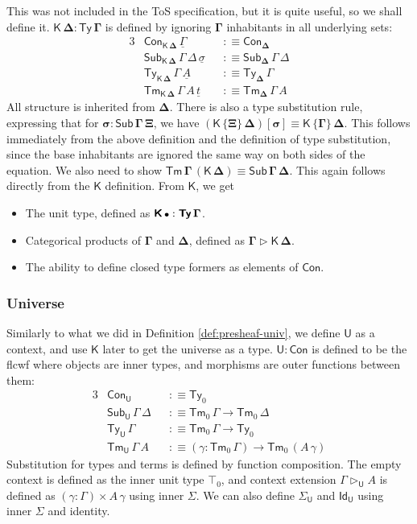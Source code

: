 \documentclass[12pt,a4paper,twoside,openany]{book}
\theoremstyle{remark}
\theoremstyle{definition}
\theoremstyle{theorem}
\newcommand{\bs}[1]{\boldsymbol{#1}}
\newcommand{\Con}{\mathsf{Con}}
\newcommand{\Sub}{\mathsf{Sub}}
\newcommand{\Tm}{\mathsf{Tm}}
\newcommand{\Ty}{\mathsf{Ty}}
\newcommand{\U}{\mathsf{U}}
\newcommand{\Id}{\mathsf{Id}}
\newcommand{\ext}{\triangleright}
\newcommand{\K}{\mathsf{K}}
\newcommand{\bCon}{\bs{\Con}}
\newcommand{\bTy}{\bs{\Ty}}
\newcommand{\bGamma}{\bs{\Gamma}}
\newcommand{\bDelta}{\bs{\Delta}}
\newcommand{\bemptycon}{\scaleobj{.75}{\bs{\bullet}}}
\newcommand{\bU}{\bs{\U}}
\newcommand{\bK}{\bs{\mathsf{K}}}
\newcommand{\ul}[1]{\underline{#1}}
\newcommand{\ulGamma}{\ul{\Gamma}}
\newcommand{\ulsigma}{\ul{\sigma}}
\newcommand{\ult}{\ul{t}}
\newcommand{\ulA}{\ul{A}}
\newcommand{\defn}{:\equiv}
\begin{document}
This was not included in the ToS specification, but it is quite useful, so we
shall define it. $\bs{\K\,\Delta : \Ty\,\Gamma}$ is defined by ignoring
$\bGamma$ inhabitants in all underlying sets:
\begin{alignat*}{3}
  & \Con_{\bs{\K\,\Delta}}\,\ulGamma &&\defn \Con_{\bDelta}\\
  & \Sub_{\bs{\K\,\Delta}}\,\Gamma\,\Delta\,\ulsigma &&\defn \Sub_{\bDelta}\,\Gamma\,\Delta\\
  &  \Ty_{\bs{\K\,\Delta}}\,\Gamma\,\ulA &&\defn \Ty_{\bDelta}\,\Gamma\\
  &  \Tm_{\bs{\K\,\Delta}}\,\Gamma\,A\,\ult &&\defn \Tm_{\bDelta}\,\Gamma\,A
\end{alignat*}
All structure is inherited from $\bDelta$. There is also a type substitution
rule, expressing that for $\bs{\sigma : \Sub\,\Gamma\,\Xi}$, we have
$\bs{(\K\,\{\Xi\}\,\Delta)[\sigma]} \equiv \bs{\K\,\{\Gamma\}\,\Delta}$. This
follows immediately from the above definition and the definition of type
substitution, since the base inhabitants are ignored the same way on both sides
of the equation. We also need to show $\bs{\Tm\,\Gamma\,(\K\,\Delta)} \equiv
\bs{\Sub\,\Gamma\,\Delta}$. This again follows directly from the $\bK$
definition. From $\bK$, we get
\begin{itemize}
\item The unit type, defined as $\bK\,\bemptycon : \bTy\,\bGamma$.
\item Categorical products of $\bGamma$ and $\bDelta$, defined as $\bs{\Gamma \ext \K\,\Delta}$.
\item The ability to define closed type formers as elements of $\bCon$.
\end{itemize}

\subsubsection{Universe}

Similarly to what we did in Definition \ref{def:presheaf-univ}, we define $\bU$
as a context, and use $\bK$ later to get the universe as a type. $\bU :
\bCon$ is defined to be the flcwf where objects are inner types, and morphisms
are outer functions between them:
\begin{alignat*}{3}
  &\Con_{\bU} &&\defn \Ty_0 \\
  &\Sub_{\bU}\,\Gamma\,\Delta &&\defn \Tm_0\,\Gamma \to \Tm_0\,\Delta \\
  &\Ty_{\bU}\,\Gamma    &&\defn \Tm_0\,\Gamma \to \Ty_0\\
  &\Tm_{\bU}\,\Gamma\,A &&\defn (\gamma : \Tm_0\,\Gamma) \to \Tm_0\,(A\,\gamma)
\end{alignat*}
Substitution for types and terms is defined by function composition. The empty
context is defined as the inner unit type $\top_0$, and context extension
$\Gamma \ext_{\bU} A$ is defined as $(\gamma : \Gamma) \times A\,\gamma$ using
inner $\Sigma$. We can also define $\Sigma_{\bU}$ and $\Id_{\bU}$ using inner
$\Sigma$ and identity.
\end{document}

